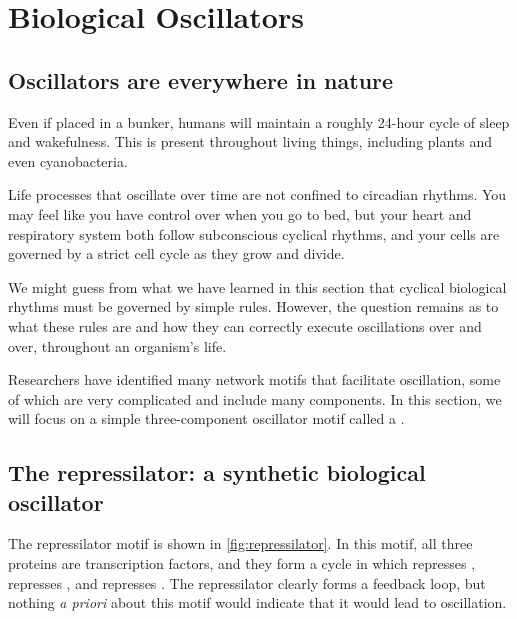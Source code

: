 \FloatBarrier
{}

\section{Biological Oscillators}
\label{sec:biological_oscillators}

\subsection{Oscillators are everywhere in nature}

Even if placed in a bunker, humans will maintain a roughly 24-hour cycle of sleep and wakefulness. This  is present throughout living things, including plants and even cyanobacteria.

Life processes that oscillate over time are not confined to circadian rhythms. You may feel like you have control over when you go to bed, but your heart and respiratory system both follow subconscious cyclical rhythms, and your cells are governed by a strict cell cycle as they grow and divide.

We might guess from what we have learned in this section that cyclical biological rhythms must be governed by simple rules. However, the question remains as to what these rules are and how they can correctly execute oscillations over and over, throughout an organism's life.

Researchers have identified many network motifs that facilitate oscillation, some of which are very complicated and include many components. In this section, we will focus on a simple three-component oscillator motif called a .

\FloatBarrier
{}
\subsection{The repressilator: a synthetic biological oscillator}

The repressilator motif is shown in \autoref{fig:repressilator}. In this motif, all three proteins are transcription factors, and they form a cycle in which  represses ,  represses , and  represses . The repressilator clearly forms a feedback loop, but nothing \textit{a priori} about this motif would indicate that it would lead to oscillation.\\


